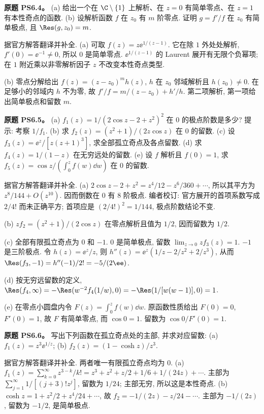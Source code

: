 \begin{exercise}
\textbf{原题 PS6.4。}\label{ass:ps6-4}
(a) 给出一个在 $\C\setminus\{1\}$ 上解析、在 $z=0$ 有简单零点、在 $z=1$ 有本性奇点的函数.
(b) 设解析函数 $f$ 在 $z_0$ 有 $m$ 阶零点. 证明 $g=f'/f$ 在 $z_0$ 有简单极点, 且 $\Res(g,z_0)=m$.
\end{exercise}
\begin{solution}
据官方解答翻译并补全.
(a) 可取 $f(z)=z\ee^{1/(z-1)}$. 它在除 $1$ 外处处解析, $f'(0)=\ee^{-1}\ne0$, 所以 $0$ 是简单零点. $\ee^{1/(z-1)}$ 的 Laurent 展开有无限个负幂项; 在 $1$ 附近乘以非零解析因子 $z$ 不改变本性奇点类型.

(b) 零点分解给出 $f(z)=(z-z_0)^mh(z)$, $h$ 在 $z_0$ 邻域解析且 $h(z_0)\ne0$. 在足够小的邻域内 $h$ 不为零, 故
$f'/f=m/(z-z_0)+h'/h$. 第二项解析, 第一项给出简单极点和留数 $m$.
\end{solution}

\begin{exercise}
\textbf{原题 PS6.5。}\label{ass:ps6-5}
(a) $f_1(z)=1/(2\cos z-2+z^2)^2$ 在 $0$ 的极点阶数是多少? 提示: 考察 $1/f_1$.
(b) 求 $f_2(z)=(z^2+1)/(2z\cos z)$ 在 $0$ 的留数.
(c) 设 $f_3(z)=\ee^z/[z(z+1)^3]$, 求全部孤立奇点及各点留数.
(d) 求 $f_4(z)=1/(1-z)$ 在无穷远处的留数.
(e) 设 $f$ 解析且 $f(0)=1$, 求 $f_5(z)=\cos z/(\int_0^z f(w)\dd w)$ 在 $0$ 的留数.
\end{exercise}
\begin{solution}
据官方解答翻译并补全.
(a) $2\cos z-2+z^2=z^4/12-z^6/360+\cdots$, 所以其平方为 $z^8/144+O(z^{10})$. 因而倒数在 $0$ 有 $8$ 阶极点. 编者校订: 官方展开的首项系数写成 $2/4!$ 而未正确平方; 首项应是 $(2/4!)^2=1/144$, 极点阶数结论不变.

(b) $zf_2=(z^2+1)/(2\cos z)$ 在零点解析且值为 $1/2$, 因而留数为 $1/2$.

(c) 全部有限孤立奇点为 $0$ 和 $-1$. $0$ 是简单极点, 留数 $\lim_{z\to0}zf_3(z)=1$.
$-1$ 是三阶极点. 令 $h(z)=\ee^z/z$, 则
$h''(z)=\ee^z(1/z-2/z^2+2/z^3)$, 从而 $\Res(f_3,-1)=h''(-1)/2!=-5/(2\ee)$.

(d) 按无穷远留数的定义,
$\Res(f_4,\infty)=-\Res(w^{-2}f_4(1/w),0)=-\Res(1/[w(w-1)],0)=1$.

(e) 在零点小圆盘内令 $F(z)=\int_0^z f(w)\dd w$. 原函数性质给出 $F(0)=0$, $F'(0)=1$, 故 $F$ 有简单零点, 而 $\cos0=1$. 留数为 $\cos0/F'(0)=1$.
\end{solution}

\begin{exercise}
\textbf{原题 PS6.6。}\label{ass:ps6-6}
写出下列函数在孤立奇点处的主部, 并求对应留数:
(a) $f_1(z)=z^3\ee^{1/z}$;
(b) $f_2(z)=(1-\cosh z)/z^3$.
\end{exercise}
\begin{solution}
据官方解答翻译并补全. 两者唯一有限孤立奇点均为 $0$.
(a) $f_1(z)=\sum_{k=0}^\infty z^{3-k}/k!=z^3+z^2+z/2+1/6+1/(24z)+\cdots$. 主部为 $\sum_{j=1}^\infty1/[(j+3)!z^j]$, 留数为 $1/24$; 主部无穷, 所以这是本性奇点.
(b) $\cosh z=1+z^2/2+z^4/24+\cdots$, 故 $f_2=-1/(2z)-z/24-\cdots$. 主部为 $-1/(2z)$, 留数为 $-1/2$, 是简单极点.
\end{solution}


